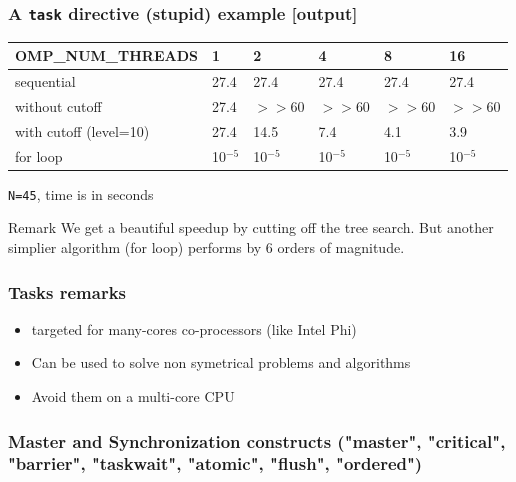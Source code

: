 \begin{frame}[containsverbatim]
\frametitle{A \texttt{task} directive (stupid) example [output]}

\begin{tabular}{|l|l|l|l|l|l|}
\hline
 \textbf{OMP\_NUM\_THREADS} & \textbf{1} & \textbf{2} & \textbf{4} & \textbf{8} & \textbf{16}\\
\hline
\hline
sequential & 27.4 & 27.4&27.4 &27.4 &27.4 \\
\hline
without cutoff & 27.4 & $>>$60 & $>>$60 & $>>$60 & $>>$60 \\
\hline
with cutoff (level=10) & 27.4 & 14.5 & 7.4 & 4.1 & 3.9 \\
\hline
for loop & 10$^{-5}$ & 10$^{-5}$ & 10$^{-5}$ & 10$^{-5}$ & 10$^{-5}$ \\
\hline

\end{tabular}

\texttt{N=45}, time is in seconds

\begin{block}{Remark}
We get a beautiful speedup by cutting off the tree search. But another simplier algorithm (for loop) performs by 6 orders of magnitude.
\end{block}
\end{frame}


\begin{frame}[containsverbatim]
\frametitle{Tasks remarks}

\begin{itemize}
        \item{targeted for many-cores co-processors (like Intel Phi)}
        \item{Can be used to solve non symetrical problems and algorithms}
        \item{Avoid them on a multi-core CPU}
\end{itemize}

\end{frame}



\subsubsection[Master and Synchronization constructs]{Master and Synchronization constructs ("master", "critical", "barrier", "taskwait", "atomic", "flush", "ordered")}


